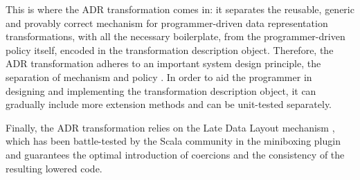 This is where the ADR transformation comes in: it separates the reusable, generic and provably correct mechanism for programmer-driven data representation transformations, with all the necessary boilerplate, from the programmer-driven policy itself, encoded in the transformation description object. Therefore, the ADR transformation adheres to an important system design principle, the separation of mechanism and policy \cite{lampson-mechanism-policy}. In order to aid the programmer in designing and implementing the transformation description object, it can gradually include more extension methods and can be unit-tested separately. %

Finally, the ADR transformation relies on the Late Data Layout mechanism \cite{ldl,ldl-www}, which has been battle-tested by the Scala community in the miniboxing plugin \cite{miniboxing,miniboxing-www} and guarantees the optimal introduction of coercions and the consistency of the resulting lowered code.

